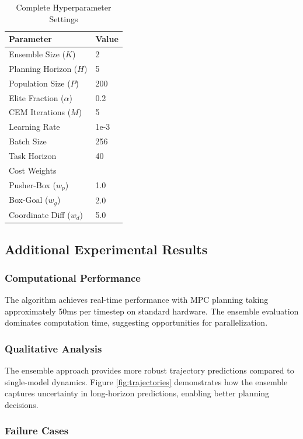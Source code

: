 \documentclass[10pt,twocolumn,letterpaper]{article}
\begin{document}
\begin{table}[H]
\centering
\caption{Complete Hyperparameter Settings}
\label{tab:hyperparams}
\begin{tabular}{@{}ll@{}}
\toprule
Parameter & Value \\
\midrule
Ensemble Size ($K$) & 2 \\
Planning Horizon ($H$) & 5 \\
Population Size ($P$) & 200 \\
Elite Fraction ($\alpha$) & 0.2 \\
CEM Iterations ($M$) & 5 \\
Learning Rate & 1e-3 \\
Batch Size & 256 \\
Task Horizon & 40 \\
\midrule
Cost Weights & \\
Pusher-Box ($w_p$) & 1.0 \\
Box-Goal ($w_g$) & 2.0 \\
Coordinate Diff ($w_d$) & 5.0 \\
\bottomrule
\end{tabular}
\end{table}

\subsection{Additional Experimental Results}

\subsubsection{Computational Performance}

The algorithm achieves real-time performance with MPC planning taking approximately 50ms per timestep on standard hardware. The ensemble evaluation dominates computation time, suggesting opportunities for parallelization.

\subsubsection{Qualitative Analysis}

The ensemble approach provides more robust trajectory predictions compared to single-model dynamics. Figure \ref{fig:trajectories} demonstrates how the ensemble captures uncertainty in long-horizon predictions, enabling better planning decisions.

\subsubsection{Failure Cases}
\end{document}
